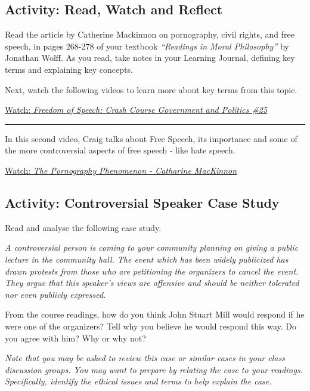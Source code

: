 \documentclass[
]{book}
\begin{document}
\hypertarget{activity-read-watch-and-reflect-6}{%
\subsection*{Activity: Read, Watch and Reflect}\label{activity-read-watch-and-reflect-6}}

\begin{reflect}
Read the article by Catherine Mackinnon on pornography, civil rights, and free speech, in pages 268-278 of your textbook \emph{``Readings in Moral Philosophy''} by Jonathan Wolff. As you read, take notes in your Learning Journal, defining key terms and explaining key concepts.

Next, watch the following videos to learn more about key terms from this topic.

\href{https://www.youtube.com/watch?v=Zeeq0qaEaLw}{Watch: \emph{Freedom of Speech: Crash Course Government and Politics \#25}}

\begin{center}\rule{0.5\linewidth}{0.5pt}\end{center}

In this second video, Craig talks about Free Speech, its importance and some of the more controversial aspects of free speech - like hate speech.

\href{https://www.youtube.com/watch?v=kdfPLJDmEIw}{Watch: \emph{The Pornography Phenomenon - Catharine MacKinnon}}
\end{reflect}

\hypertarget{activity-controversial-speaker-case-study}{%
\subsection*{Activity: Controversial Speaker Case Study}\label{activity-controversial-speaker-case-study}}

\begin{reflect}
Read and analyse the following case study.

\emph{A controversial person is coming to your community planning on giving a public lecture in the community hall. The event which has been widely publicized has drawn protests from those who are petitioning the organizers to cancel the event. They argue that this speaker's views are offensive and should be neither tolerated nor even publicly expressed. }

From the course readings, how do you think John Stuart Mill would respond if he were one of the organizers? Tell why you believe he would respond this way. Do you agree with him? Why or why not?

\emph{Note that you may be asked to review this case or similar cases in your class discussion groups. You may want to prepare by relating the case to your readings. Specifically, identify the ethical issues and terms to help explain the case.}
\end{reflect}
\end{document}
